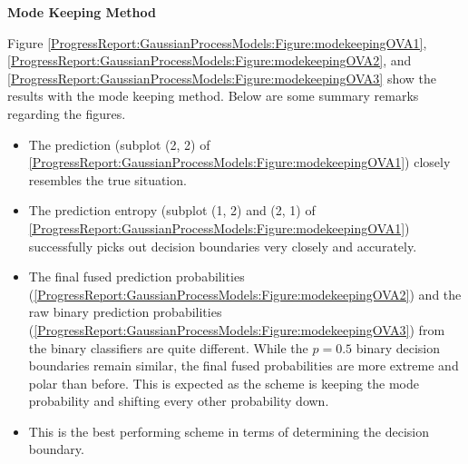 				\FloatBarrier
				
				\textbf{Mode Keeping Method}
				
				Figure \ref{ProgressReport:GaussianProcessModels:Figure:modekeepingOVA1}, \ref{ProgressReport:GaussianProcessModels:Figure:modekeepingOVA2}, and \ref{ProgressReport:GaussianProcessModels:Figure:modekeepingOVA3} show the results with the mode keeping method. Below are some summary remarks regarding the figures.
				
				\begin{itemize}
					\item The prediction (subplot (2, 2) of \cref{ProgressReport:GaussianProcessModels:Figure:modekeepingOVA1}) closely resembles the true situation.
					\item The prediction entropy (subplot (1, 2) and (2, 1) of \cref{ProgressReport:GaussianProcessModels:Figure:modekeepingOVA1}) successfully picks out decision boundaries very closely and accurately.
					\item The final fused prediction probabilities (\cref{ProgressReport:GaussianProcessModels:Figure:modekeepingOVA2}) and the raw binary prediction probabilities (\cref{ProgressReport:GaussianProcessModels:Figure:modekeepingOVA3}) from the binary classifiers are quite different. While the $p = 0.5$ binary decision boundaries remain similar, the final fused probabilities are more extreme and polar than before. This is expected as the scheme is keeping the mode probability and shifting every other probability down.
					\item This is the best performing scheme in terms of determining the decision boundary.
				\end{itemize}
				
